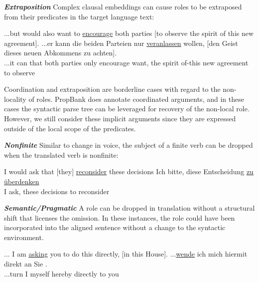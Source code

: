 \documentclass[11pt]{article}
\begin{document}
 {\bf \flushleft \textit{Extraposition}} Complex clausal embeddings can cause roles to be extraposed from their predicates in the target language text:

\begin{exe}
	\ex  ...but would also want to \underline{encourage} both parties [to observe the spirit of this new agreement].
	\vspace*{-2mm}
	\gll ...er kann die beiden Parteien nur \underline{veranlassen} wollen, [den Geist dieses neuen Abkommens zu achten].\\
	...it can that both parties only encourage want, the spirit {of-this} new agreement to observe\\
\end{exe}

Coordination and extraposition are borderline cases with regard to the non-locality of roles.
PropBank does annotate coordinated arguments, and in these cases the syntactic parse tree can be leveraged for recovery of the non-local role.  However, we still consider these implicit arguments since they are expressed outside of the local scope of the predicates.

 {\bf \flushleft \textit{Nonfinite}} Similar to change in voice, the subject of a finite verb can be dropped when the translated verb is nonfinite:

\begin{exe}
\ex  I would ask that [they] \underline{reconsider} these decisions
 \vspace*{-2mm}
\gll Ich bitte, diese Entscheidung \underline{zu {\"u}berdenken} \\
I ask, these decisions {to reconsider}\\
\end{exe}

 {\bf \flushleft \textit{Semantic/Pragmatic}} A role can be dropped in translation without a structural shift that licenses the omission. In these instances, the role could have been incorporated into the aligned sentence without a change to the syntactic environment.
\begin{exe}
\ex ... I am \underline{asking} you to do this directly, [in this House].
\gll ...\underline{wende} ich mich hiermit direkt an Sie .\\
...turn I myself hereby directly to you \\
\end{exe}
\end{document}
